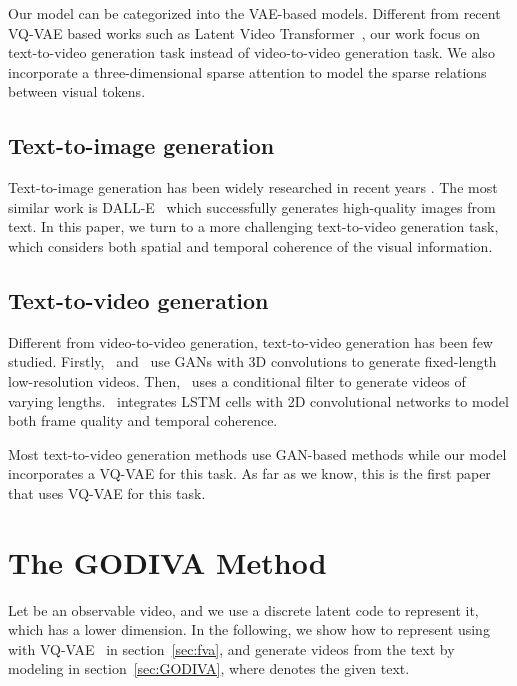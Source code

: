 \documentclass{article}
\begin{document}
Our model can be categorized into the VAE-based models. Different from recent VQ-VAE based works such as Latent Video Transformer~\cite{rakhimovLatentVideoTransformer2020}, our work focus on  text-to-video generation task instead of video-to-video generation task. We also incorporate a three-dimensional sparse attention to model the sparse relations between visual tokens.

\subsection{Text-to-image generation} \label{sec:texttoimage}
Text-to-image generation has been widely researched in recent years \cite{qiaoMirrorGANLearningTexttoimage2019}. The most similar work is DALL-E~\cite{rameshZeroShotTexttoImageGeneration2021} which successfully generates high-quality images from text. In this paper, we turn to a more challenging text-to-video generation task, which considers both spatial and temporal coherence of the visual information.


\subsection{Text-to-video generation} \label{sec:texttovideo}
Different from video-to-video generation, text-to-video generation has been few studied. Firstly,~\cite{liVideoGenerationText2018} and~\cite{panCreateWhatYou2017} use GANs with 3D convolutions to generate fixed-length low-resolution videos. Then,~\cite{balajiConditionalGANDiscriminative2019} uses a conditional filter to generate videos of varying lengths.~\cite{dengIRCGANIntrospectiveRecurrent2019} integrates LSTM cells with 2D convolutional networks to model both frame quality and temporal coherence.

Most text-to-video generation methods use GAN-based methods while our model incorporates a VQ-VAE for this task. As far as we know, this is the first paper that uses VQ-VAE for this task.



\section{The GODIVA Method}
Let  be an observable video, and we use a discrete latent code  to represent it, which has a lower dimension. In the following, we show how to represent  using  with VQ-VAE~\cite{oordNeuralDiscreteRepresentation2017} in section~\ref{sec:fva}, and generate videos from the text by modeling  in section~\ref{sec:GODIVA}, where  denotes the given text.
\end{document}
